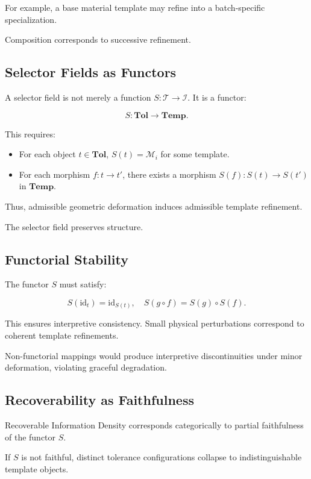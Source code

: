 \documentclass[11pt]{article}
\begin{document}
For example, a base material template may refine into
a batch-specific specialization.

Composition corresponds to successive refinement.

\subsection{Selector Fields as Functors}

A selector field is not merely a function
$S : \mathcal{T} \to \mathcal{I}$.
It is a functor:

\[
S : \mathbf{Tol} \to \mathbf{Temp}.
\]

This requires:

\begin{itemize}
\item For each object $t \in \mathbf{Tol}$,
      $S(t) = \mathcal{M}_i$ for some template.
\item For each morphism $f : t \to t'$,
      there exists a morphism
      $S(f) : S(t) \to S(t')$
      in $\mathbf{Temp}$.
\end{itemize}

Thus, admissible geometric deformation
induces admissible template refinement.

The selector field preserves structure.

\subsection{Functorial Stability}

The functor $S$ must satisfy:

\[
S(\text{id}_t) = \text{id}_{S(t)},
\quad
S(g \circ f) = S(g) \circ S(f).
\]

This ensures interpretive consistency.
Small physical perturbations correspond to
coherent template refinements.

Non-functorial mappings would produce
interpretive discontinuities under minor deformation,
violating graceful degradation.

\subsection{Recoverability as Faithfulness}

Recoverable Information Density corresponds categorically
to partial faithfulness of the functor $S$.

If $S$ is not faithful,
distinct tolerance configurations collapse
to indistinguishable template objects.
\end{document}
